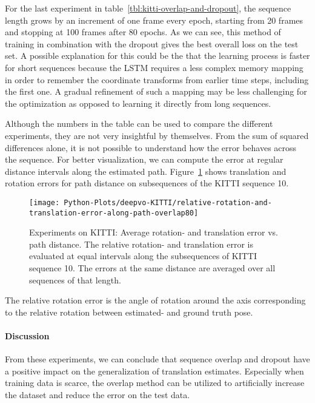 		For the last experiment in table~\ref{tbl:kitti-overlap-and-dropout}, the sequence length grows by an increment of one frame every epoch, starting from 20 frames and stopping at 100 frames after 80 epochs.
		As we can see, this method of training in combination with the dropout gives the best overall loss on the test set.
		A possible explanation for this could be the that the learning process is faster for short sequences because the LSTM requires a less complex memory mapping in order to remember the coordinate transforms from earlier time steps, including the first one.
		A gradual refinement of such a mapping may be less challenging for the optimization as opposed to learning it directly from long sequences.
		
		Although the numbers in the table can be used to compare the different experiments, they are not very insightful by themselves.
		From the sum of squared differences alone, it is not possible to understand how the error behaves across the sequence.
		For better visualization, we can compute the error at regular distance intervals along the estimated path.
		Figure~\ref{fig:kitti-avg-rotation-translation-error-vs-path-distance} shows translation and rotation errors for path distance on subsequences of the KITTI sequence 10.
		\begin{figure}[t]
			\centering
			\texttt{[image: Python-Plots/deepvo-KITTI/relative-rotation-and-translation-error-along-path-overlap80]}
			\caption[Experiments on KITTI: Average rotation- and translation error vs. path distance]
					{Experiments on KITTI: Average rotation- and translation error vs. path distance.
					 The relative rotation- and translation error is evaluated at equal intervals along the subsequences of KITTI sequence 10.
					 The errors at the same distance are averaged over all sequences of that length.
					 \label{fig:kitti-avg-rotation-translation-error-vs-path-distance}}
		\end{figure}
		The relative rotation error is the angle of rotation around the axis corresponding to the relative rotation between estimated- and ground truth pose.
		
		\paragraph{Discussion}
		From these experiments, we can conclude that sequence overlap and dropout have a positive impact on the generalization of translation estimates.
		Especially when training data is scarce, the overlap method can be utilized to artificially increase the dataset and reduce the error on the test data.
		

